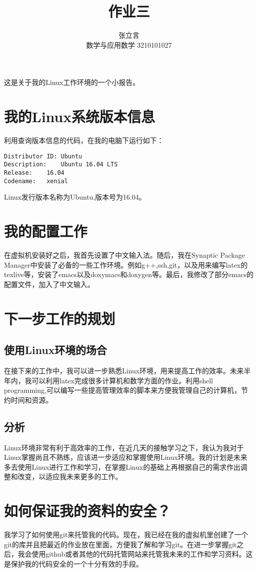 \documentclass{ctexart}
\title{作业三}
\author{张立言 \\ 数学与应用数学 3210101027}
\begin{document}
这是关于我的Linux工作环境的一个小报告。

\section{我的Linux系统版本信息}
利用查询版本信息的代码\cite{CSDNLinuxcommand}，在我的电脑下运行如下：
\begin{verbatim}
Distributor ID:	Ubuntu
Description:	Ubuntu 16.04 LTS
Release:	16.04
Codename:	xenial
\end{verbatim}
Linux发行版本名称为Ubuntu,版本号为16.04。

\section{我的配置工作}

在虚拟机安装好之后，我首先设置了中文输入法。随后，我在Synaptic Package Manager中安装了必备的一些工作环境。例如g++,ssh,git，以及用来编写latex的texlive等，安装了emacs以及doxymacs和doxygen等。最后，我修改了部分emacs的配置文件，加入了中文输入。

\section{下一步工作的规划}

\subsection{使用Linux环境的场合}

在接下来的工作中，我可以进一步熟悉Linux环境，用来提高工作的效率。未来半年内，我可以利用latex完成很多计算机和数学方面的作业。利用shell programming,可以编写一些提高管理效率的脚本来方便我管理自己的计算机，节约时间和资源。

\subsection{分析}

Linux环境非常有利于高效率的工作，在近几天的接触学习之下，我认为我对于Linux掌握尚且不熟练，应该进一步适应和掌握使用Linux环境。我的计划是未来多去使用Linux进行工作和学习，在掌握Linux的基础上再根据自己的需求作出调整和改变，以适应我未来更多的工作。

\section{如何保证我的资料的安全？}

我学习了如何使用git来托管我的代码\cite{2020Introduction}。现在，我已经在我的虚拟机里创建了一个git的库并且把最近的作业放在里面，方便我了解和学习git。在进一步掌握git之后，我会使用github或者其他的代码托管网站来托管我未来的工作和学习资料。这是保护我的代码安全的一个十分有效的手段。



\end{document}
